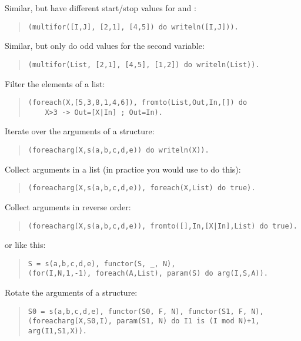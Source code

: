 Similar, but have different start/stop values for  and :
\begin{quote}
\begin{verbatim}
(multifor([I,J], [2,1], [4,5]) do writeln([I,J])).
\end{verbatim}
\end{quote}

Similar, but only do odd values for the second variable:
\begin{quote}
\begin{verbatim}
(multifor(List, [2,1], [4,5], [1,2]) do writeln(List)).
\end{verbatim}
\end{quote}

Filter the elements of a list:
\begin{quote}
\begin{verbatim}
(foreach(X,[5,3,8,1,4,6]), fromto(List,Out,In,[]) do
    X>3 -> Out=[X|In] ; Out=In).
\end{verbatim}
\end{quote}

Iterate over the arguments of a structure:
\begin{quote}
\begin{verbatim}
(foreacharg(X,s(a,b,c,d,e)) do writeln(X)).
\end{verbatim}
\end{quote}

Collect arguments in a list
(in practice you would use  to do this):
\begin{quote}
\begin{verbatim}
(foreacharg(X,s(a,b,c,d,e)), foreach(X,List) do true).
\end{verbatim}
\end{quote}

Collect arguments in reverse order:
\begin{quote}
\begin{verbatim}
(foreacharg(X,s(a,b,c,d,e)), fromto([],In,[X|In],List) do true).
\end{verbatim}
\end{quote}
or like this:
\begin{quote}
\begin{verbatim}
S = s(a,b,c,d,e), functor(S, _, N),
(for(I,N,1,-1), foreach(A,List), param(S) do arg(I,S,A)).
\end{verbatim}
\end{quote}

Rotate the arguments of a structure:
\begin{quote}
\begin{verbatim}
S0 = s(a,b,c,d,e), functor(S0, F, N), functor(S1, F, N),
(foreacharg(X,S0,I), param(S1, N) do I1 is (I mod N)+1, arg(I1,S1,X)).
\end{verbatim}
\end{quote}

